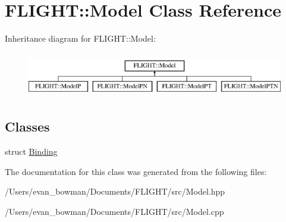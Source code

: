 \hypertarget{class_f_l_i_g_h_t_1_1_model}{}\section{F\+L\+I\+G\+HT\+:\+:Model Class Reference}
\label{class_f_l_i_g_h_t_1_1_model}
Inheritance diagram for F\+L\+I\+G\+HT\+:\+:Model\+:\begin{figure}[H]
\begin{center}
\leavevmode
\includegraphics[height=2.000000cm]{class_f_l_i_g_h_t_1_1_model}
\end{center}
\end{figure}
\subsection*{Classes}
\begin{DoxyCompactItemize}
\item 
struct \hyperlink{struct_f_l_i_g_h_t_1_1_model_1_1_binding}{Binding}
\end{DoxyCompactItemize}


The documentation for this class was generated from the following files\+:\begin{DoxyCompactItemize}
\item 
/\+Users/evan\+\_\+bowman/\+Documents/\+F\+L\+I\+G\+H\+T/src/Model.\+hpp\item 
/\+Users/evan\+\_\+bowman/\+Documents/\+F\+L\+I\+G\+H\+T/src/Model.\+cpp\end{DoxyCompactItemize}
